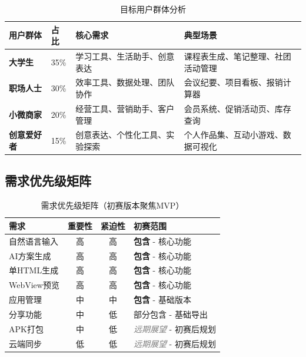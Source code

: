\documentclass[a4paper,12pt]{ctexart}
\newcommand{\highlight}[1]{\textcolor{vivoblue}{\textbf{#1}}}
\newcommand{\note}[1]{\textcolor{graytext}{\textit{#1}}}
\begin{document}
\begin{table}[H]
    \centering
    \caption{目标用户群体分析}
    \begin{tabularx}{\textwidth}{|l|l|X|X|}
        \hline
        \textbf{用户群体} & \textbf{占比} & \textbf{核心需求} & \textbf{典型场景} \\
        \hline
        \highlight{大学生} & 35\% & 学习工具、生活助手、创意表达 & 课程表生成、笔记整理、社团活动管理 \\
        \hline
        \highlight{职场人士} & 30\% & 效率工具、数据处理、团队协作 & 会议纪要、项目看板、报销计算器 \\
        \hline
        \highlight{小微商家} & 20\% & 经营工具、营销助手、客户管理 & 会员系统、促销活动页、库存查询 \\
        \hline
        \highlight{创意爱好者} & 15\% & 创意表达、个性化工具、实验探索 & 个人作品集、互动小游戏、数据可视化 \\
        \hline
    \end{tabularx}
\end{table}

\subsection{需求优先级矩阵}

\begin{table}[H]
    \centering
    \caption{需求优先级矩阵（初赛版本聚焦MVP）}
    \begin{tabularx}{\textwidth}{|l|c|c|X|}
        \hline
        \textbf{需求} & \textbf{重要性} & \textbf{紧迫性} & \textbf{初赛范围} \\
        \hline
        自然语言输入 & 高 & 高 & \highlight{包含} - 核心功能 \\
        \hline
        AI方案生成 & 高 & 高 & \highlight{包含} - 核心功能 \\
        \hline
        单HTML生成 & 高 & 高 & \highlight{包含} - 核心功能 \\
        \hline
        WebView预览 & 高 & 高 & \highlight{包含} - 核心功能 \\
        \hline
        应用管理 & 中 & 中 & \highlight{包含} - 基础版本 \\
        \hline
        分享功能 & 中 & 低 & 部分包含 - 基础导出 \\
        \hline
        APK打包 & 中 & 低 & \note{远期展望} - 初赛后规划 \\
        \hline
        云端同步 & 低 & 低 & \note{远期展望} - 初赛后规划 \\
        \hline
    \end{tabularx}
\end{table}
\end{document}
